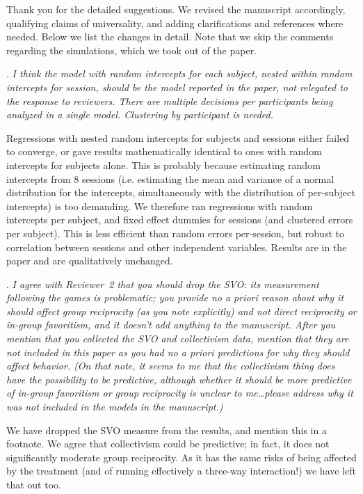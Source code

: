 \documentclass[a4paper,11pt,leqno]{article}
\newcounter{review}
\newcommand{\review}[1]{
\stepcounter{review}
\noindent \arabic{review}.
{\it #1}
\medskip
}
\begin{document}
Thank you for the detailed suggestions. We revised the manuscript accordingly, qualifying claims of universality, and adding clarifications and references where needed.
Below we list the changes in detail. 
Note that we skip the comments regarding the simulations, which we took out of the paper.


\bigskip

\review{
I think the model with random intercepts for each subject, nested within random intercepts for session, should be the model reported in the paper, not relegated to the response to reviewers. There are multiple decisions per participants being analyzed in a single model. Clustering by participant is needed.
}

Regressions with nested random intercepts for subjects and sessions either failed
to converge, or gave results mathematically identical to ones with random intercepts for subjects 
alone. This is probably because estimating random intercepts from 8 sessions (i.e. estimating the mean
and variance of a normal distribution for the intercepts, simultaneously with the distribution of per-subject intercepts) is too demanding. We therefore
ran regressions with random intercepts per subject, and fixed effect dummies for sessions
(and clustered errors per subject). This is less efficient than random errors per-session, but robust
to correlation between sessions and other independent variables. Results are in the paper and
are qualitatively unchanged.

\bigskip

\review{
I agree with Reviewer~2 that you should drop the SVO: its measurement following the games is problematic; you provide no a priori reason about why it should affect group reciprocity (as you note explicitly) and not direct reciprocity or in-group favoritism, and it doesn't add anything to the manuscript. After you mention that you collected the SVO and collectivism data, mention that they are not included in this paper as you had no a priori predictions for why they should affect behavior. (On that note, it seems to me that the collectivism thing does have the possibility to be predictive, although whether it should be more predictive of in-group favoritism or group reciprocity is unclear to me\ldots please address why it was not included in the models in the manuscript.)
}

We have dropped the SVO measure from the results, and mention this in a footnote. We agree that collectivism
could be predictive; in fact, it does not significantly moderate group reciprocity. As it has the same
risks of being affected by the treatment (and of running effectively a three-way interaction!) we have
left that out too.
\end{document}
